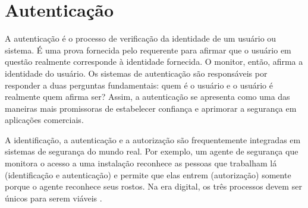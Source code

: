 \section{Autenticação}
\label{sec:autenticacao}


A autenticação é o processo de verificação da identidade de um usuário ou
sistema.
É uma prova fornecida pelo requerente para afirmar que o usuário em questão
realmente corresponde à identidade fornecida.
O monitor, então, afirma a identidade do usuário.
Os sistemas de autenticação são responsáveis por responder a duas perguntas
fundamentais:
quem é o usuário e o usuário é realmente quem afirma ser?
Assim, a autenticação se apresenta como uma das maneiras mais promissoras de
estabelecer confiança e aprimorar a segurança em aplicações comerciais\cite{
    idrus2013}.

A identificação, a autenticação e a autorização são frequentemente integradas em
sistemas de segurança do mundo real.
Por exemplo, um agente de segurança que monitora o acesso a uma instalação
reconhece as pessoas que trabalham lá (identificação e autenticação) e permite
que elas entrem (autorização) somente porque o agente reconhece seus rostos.
Na era digital, os três processos devem ser únicos para serem viáveis
\cite[p.97]{renaud2004}.

